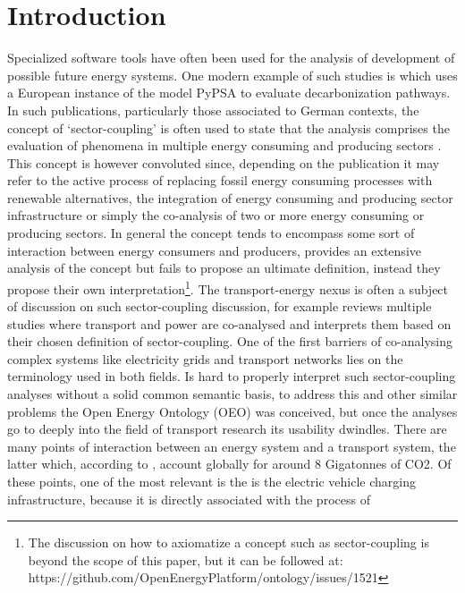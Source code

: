 ﻿\section{Introduction}
\label{introduction}
Specialized software tools have often been used for the analysis of development
of possible future energy systems. One modern example of such studies is
\cite{Victoria.2022} which uses a European instance of the model PyPSA
\cite{Brown.2018} to evaluate decarbonization pathways. In such publications,
particularly those associated to German contexts, the concept of
`sector-coupling' is often used to state that the analysis comprises the
evaluation of phenomena in multiple energy consuming and producing sectors
\cite{Fridgen.2020}. This concept is however convoluted since, depending on the
publication it may refer to the active process of replacing fossil energy
consuming processes with renewable alternatives, the integration of energy
consuming and producing sector infrastructure or simply the co-analysis of two
or more energy consuming or producing sectors. In general the concept tends to
encompass some sort of interaction between energy consumers and producers,
\cite{Ramsebner.2021} provides an extensive analysis of the concept but fails
to propose an ultimate definition, instead they propose their own
interpretation\footnote{The discussion on how to axiomatize a concept such as
sector-coupling is beyond the scope of this paper, but it can be followed at:
https://github.com/OpenEnergyPlatform/ontology/issues/1521}. The
transport-energy nexus is often a subject of discussion on such sector-coupling
discussion, for example \cite{Robinius.2017} reviews multiple studies where
transport and power are co-analysed and interprets them based on their chosen
definition of sector-coupling. One of the first barriers of co-analysing
complex systems like electricity grids and transport networks lies on the
terminology used in both fields. Is hard to properly interpret such
sector-coupling analyses without a solid common semantic basis, to address this
and other similar problems the Open Energy Ontology (OEO) \cite{Booshehri.2021}
was conceived, but once the analyses go to deeply into the field of transport
research its usability dwindles. There are many points of interaction between
an energy system and a transport system, the latter which, according to
\cite{IEA.2023}, account globally for around 8 Gigatonnes of CO2. Of these
points, one of the most relevant is the is the electric vehicle charging
infrastructure, because it is directly associated with the process of
